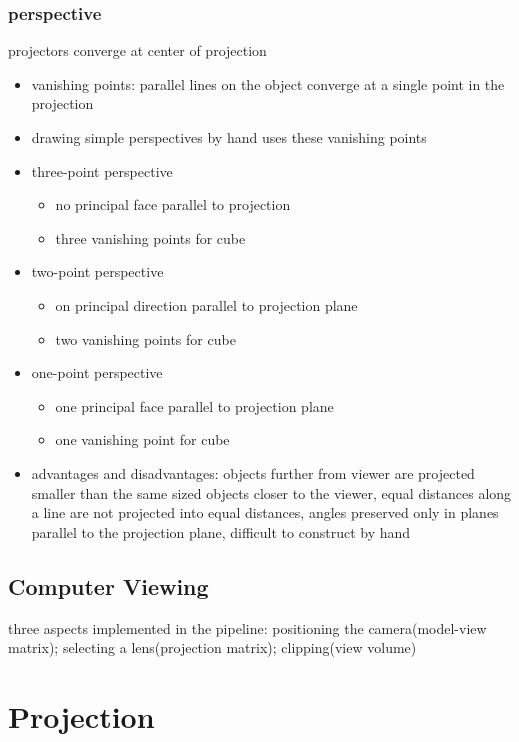 \documentclass[11pt,a4paper]{article}
\begin{document}
	\subsubsection{perspective}
	projectors converge at center of projection
	\begin{itemize}
		\item vanishing points: parallel lines on the object converge at a single point in the projection
		\item drawing simple perspectives by hand uses these vanishing points
		\item three-point perspective
		\begin{itemize}
			\item no principal face parallel to projection
			\item three vanishing points for cube
		\end{itemize}
		\item two-point perspective
		\begin{itemize}
			\item on principal direction parallel to projection plane
			\item two vanishing points for cube
		\end{itemize}
		\item one-point perspective
		\begin{itemize}
			\item one principal face parallel to projection plane
			\item one vanishing point for cube
		\end{itemize}
		\item advantages and disadvantages: objects further from viewer are projected smaller than the same sized objects closer to the viewer, equal distances along a line are not projected into equal distances, angles preserved only in planes parallel to the projection plane, difficult to construct by hand
	\end{itemize}

	\subsection{Computer Viewing}
	three aspects implemented in the pipeline: positioning the camera(model-view matrix); selecting a lens(projection matrix); clipping(view volume)


\section{Projection}
\end{document}

